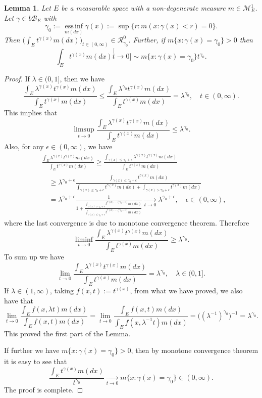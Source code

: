 \documentclass[12pt, a4paper]{amsart}
\newtheorem{lem}[thm]{Lemma}
\theoremstyle{definition}
\numberwithin{equation}{section}
\begin{document}
\begin{lem}\label{lem:regularly_variation_and_integration}
	Let $E$ be a measurable space with a non-degenerate measure $m \in \mathcal M^1_E$.
	Let $ \gamma \in b\mathscr B_E$ with
\[
	\gamma_0
	:= \operatorname*{ess\,inf}_{m(dx)} \gamma(x)
	:= \sup\{r:m(x:\gamma(x) < r) = 0\}.
\]
	Then $\big(\int_E t^{\gamma(x)} m(dx)\big)_{t\in (0,\infty)} \in \mathcal R^0_{\gamma_0}$.
	Further, if $m\{x:\gamma(x) = \gamma_0\}>0$ then
\[
	\int_E t^{\gamma(x)} m(dx)
	\stackrel[t\to 0]{}{\sim}  m\{x:\gamma(x) = \gamma_0\} t^{\gamma_0}.
\]
	
\end{lem}

\begin{proof}
	If $\lambda \in (0,1]$, then we have
\[
	\frac{\int_E \lambda^{\gamma(x)} t^{\gamma(x)} m(dx)}{\int_E t^{\gamma(x)} m(dx)}
	\leq \frac{\int_E \lambda^{\gamma_0} t^{\gamma(x)} m(dx)}{\int_E t^{\gamma(x)} m(dx)}
	= \lambda^{\gamma_0},
	\quad t\in (0,\infty).
\]
	This implies that
\[
	\limsup_{t\to 0}\frac{\int_E \lambda^{\gamma(x)} t^{\gamma(x)} m(dx)}{\int_E t^{\gamma(x)} m(dx)}
	\leq \lambda ^{\gamma_0}.
\]
	Also, for any $\epsilon \in (0,\infty)$, we have
\[\begin{split}
	&\frac{\int_E \lambda^{\gamma(x)} t^{\gamma(x)} m(dx)}{\int_E t^{\gamma(x)} m(dx)}
	\geq \frac{ \int_{ \gamma(x) \leq  \gamma_0 + \epsilon } \lambda^{ \gamma(x) } t^{ \gamma(x)} m(dx) } { \int_E t^{ \gamma(x) } m(dx) }
	\\&\quad \geq \lambda^{ \gamma_0 + \epsilon} \frac{ \int_{ \gamma(x) \leq \gamma_0 + \epsilon } t^{ \gamma(x)} m(dx) } { \int_{ \gamma(x) \leq \gamma_0 + \epsilon}t^{\gamma(x)}m(dx)+ \int_{\gamma(x) > \gamma_0 + \epsilon} t^{\gamma(x)}m(dx)}
	\\&\quad = \lambda^{\gamma_0 + \epsilon} \frac{1}{1+ \frac{\int_{\gamma(x) > \gamma_0 + \epsilon}t^{\gamma(x) - (\gamma_0 + \epsilon)}m(dx)}{\int_{\gamma(x) \leq \gamma_0 + \epsilon}t^{\gamma(x)- (\gamma_0 + \epsilon)}m(dx)}}
	\xrightarrow[t\to 0]{} \lambda ^{\gamma_0 + \epsilon},
	\quad \epsilon\in (0, \infty),
\end{split}\]
	where the last convergence is due to monotone convergence theorem.
	Therefore
\[
	\liminf_{t\to 0}\frac{\int_E \lambda^{\gamma(x)} t^{\gamma(x)} m(dx)}{\int_E t^{\gamma(x)} m(dx)}
	\geq \lambda ^{\gamma_0}.
\]
	To sum up we have
\[
	\lim_{t\to 0}\frac{\int_E \lambda^{\gamma(x)} t^{\gamma(x)} m(dx)}{\int_E t^{\gamma(x)} m(dx)}
	= \lambda ^{\gamma_0},	
	\quad \lambda \in (0,1].
\]
	If $\lambda \in (1,\infty)$, taking $f(x, t):= t^{\gamma(x)}$, from what we have proved, we also have that
\[
	\lim_{t\to 0}\frac{\int_E f(x,\lambda t)m(dx)}{\int_E f(x, t)m(dx)}
	= \lim_{t\to 0}\frac{\int_E f(x,t)m(dx)}{\int_E f(x, \lambda^{-1} t)m(dx)}
	= \big((\lambda^{-1})^{\gamma_0} \big)^{-1}
	= \lambda ^{\gamma_0}.
\]
	This proved the first part of the Lemma.
	
	If further we have $m\{x:\gamma(x) = \gamma_0\}>0$, then by monotone convergence theorem  it is easy to see that
\[
	\frac{\int_E t^{\gamma(x)} m(dx)}{t^{\gamma_0}}
	\xrightarrow[t\to 0]{} m\{x:\gamma(x) = \gamma_0\}\in (0,\infty) .
\]
	The proof is complete.
	
\end{proof}
\end{document}
